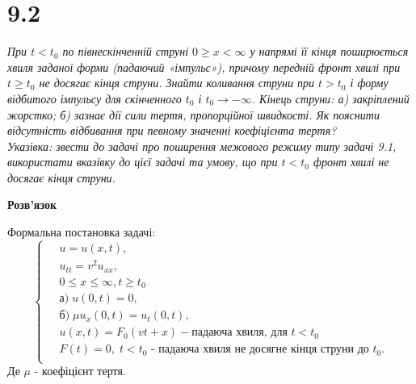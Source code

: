 


%


\section[Задача №9.2]{9.2}

\textit{При $t < t_0$ по півнескінченній струні $0 \geq x < \infty$ у напрямі її кінця поширюється хвиля заданої форми (падаючий «імпульс»), причому передній фронт хвилі при $t \geq t_0$ не досягає кінця струни. Знайти коливання струни при $t > t_0$ і форму відбитого імпульсу для скінченного $t_0$ і $t_0 \to -\infty$. Кінець струни: а) закріплений жорстко; б) зазнає дії сили тертя, пропорційної швидкості. Як пояснити відсутність відбивання при певному значенні коефіцієнта тертя?\\
Указівка: звести до задачі про поширення межового режиму типу задачі 9.1, використати вказівку до цієї задачі та умову, що при $t < t_0$ фронт хвилі не досягає кінця струни.}

\begin{center}
    \large{\textbf{Розв'язок}}
\end{center}

\noindent Формальна постановка задачі:
\begin{equation} \label{withered}
    \left\{ \begin{aligned} 
            \;&u = u(x,t), \\
            &u_{tt} = v^2 u_{xx}, \\
            &0 \leq x \leq \infty, t \geq t_0 \\
            &\text{а)}\; u(0,t) = 0,\\
            &\text{б)}\; \mu u_x(0,t) = u_t(0,t),\\
            &u(x,t) = F_0(vt + x) - \text{падаюча хвиля, для  } t<t_0\\
            &F(t) = 0,\;t < t_0 \text{  - падаюча хвиля не досягне кінця струни до }t_0.\\
    \end{aligned} \right.
\end{equation}
Де $\mu$ - коефіцієнт тертя. 

